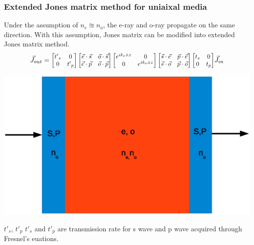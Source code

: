 \documentclass{beamer}
\newcommand\scalemath[2]{\scalebox{#1}{\mbox{\ensuremath{\displaystyle #2}}}} %
\begin{document}
\begin{frame}
\frametitle{Extended Jones matrix method for uniaixal media}
Under the assumption of $n_e \approxeq n_o$, the e-ray and o-ray propagate on the same direction. With this assumption, Jones matrix can be modified into extended Jones matrix method.
\begin{eqnarray}
\vec{J}_{out} = 
\scalemath{0.9}{
\begin{bmatrix}
{t'}_s & 0 \\ 0 & {t'}_p
\end{bmatrix}
\begin{bmatrix}
\vec{e}\cdot\vec{s} & \vec{o}\cdot\vec{s} \\ \vec{e}\cdot\vec{p} & \vec{o}\cdot\vec{p}
\end{bmatrix}
\begin{bmatrix}
e^{ik_e\vartriangle z} & 0 \\ 0 & e^{ik_o\vartriangle z}
\end{bmatrix}
\begin{bmatrix}
\vec{s}\cdot\vec{e} & \vec{p}\cdot\vec{e} \\ \vec{s}\cdot\vec{o} & \vec{p}\cdot\vec{o}
\end{bmatrix}
\begin{bmatrix}
t_s & 0 \\ 0 & t_p
\end{bmatrix}
}
\vec{J}_{in} \nonumber
\nonumber
\label{eq:extendedJones}
\end{eqnarray}
\begin{center}
\includegraphics[scale=0.25]{extj_uniaxial.eps}
\end{center}
${t'}_s$, ${t'}_p$ ${t'}_s$ and ${t'}_p$ are transmission rate for s wave and p wave acquired through Fresnel's euations.
\end{frame}
\end{document}
